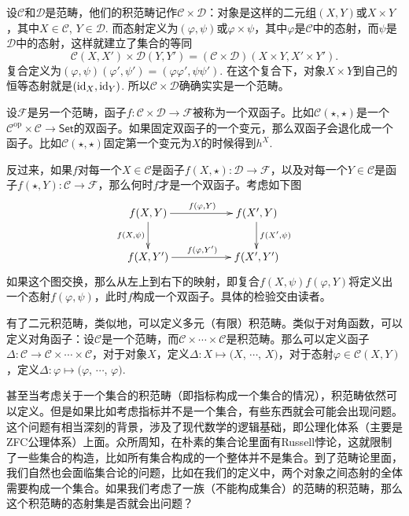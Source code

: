设$\mathcal{C}$和$\mathcal{D}$是范畴，他们的积范畴记作$\mathcal{C}\times\mathcal{D}$：对象是这样的二元组$(X,Y)$或$X\times Y$，其中$X\in \mathcal{C}$, $Y\in\mathcal{D}$. 而态射定义为$(\varphi,\psi)$或$\varphi\times \psi$，其中$\varphi$是$\mathcal{C}$中的态射，而$\psi$是$\mathcal{D}$中的态射，这样就建立了集合的等同
\[
	{\mathcal{C}}(X,X')\times {\mathcal{D}}(Y,Y')=(\mathcal{C}\times \mathcal{D})(X\times Y,X'\times Y').
\]
复合定义为$(\varphi,\psi)(\varphi',\psi')=(\varphi\varphi',\psi\psi')$. 在这个复合下，对象$X\times Y$到自己的恒等态射就是$(\operatorname{id}_X,\operatorname{id}_Y)$. 所以$\mathcal{C}\times\mathcal{D}$确确实实是一个范畴。

设$\mathcal{F}$是另一个范畴，函子$f:\mathcal{C}\times \mathcal{D}\to \mathcal{F}$被称为一个双函子。比如$\mathcal{C}(\star,\star)$是一个$\mathcal{C}^\text{op}\times \mathcal{C}\to \mathsf{Set}$的双函子。如果固定双函子的一个变元，那么双函子会退化成一个函子。比如$\mathcal{C}(\star,\star)$固定第一个变元为$X$的时候得到$h^X$.

反过来，如果$f$对每一个$X\in \mathcal{C}$是函子$f(X,\star):\mathcal{D}\to \mathcal{F}$，以及对每一个$Y\in \mathcal{C}$是函子$f(\star,Y):\mathcal{C}\to \mathcal{F}$，那么何时$f$才是一个双函子。考虑如下图
\[
\begin{xy}
	\xymatrix{
		f(X,Y)\ar[rr]^{f(\varphi,Y)} \ar[d]_{f(X,\psi)}&&f(X',Y) \ar[d]^{f(X',\psi)}\\
		f(X,Y')\ar[rr]^{f(\varphi,Y')}&&f(X',Y')
	}
\end{xy}
\]
如果这个图交换，那么从左上到右下的映射，即复合$f(X,\psi)f(\varphi,Y)$将定义出一个态射$f(\varphi,\psi)$，此时$f$构成一个双函子。具体的检验交由读者。

\para[对角函子] \label{digf}有了二元积范畴，类似地，可以定义多元（有限）积范畴。类似于对角函数，可以定义对角函子：设$\mathcal{C}$是一个范畴，而$\mathcal{C}\times \cdots \times \mathcal{C}$是积范畴。那么可以定义函子$\Delta:\mathcal{C}\to \mathcal{C}\times \cdots \times \mathcal{C}$，对于对象$X$，定义$\Delta:X\mapsto (X$, $\cdots$, $X)$，对于态射$\varphi\in \mathcal{C}(X,Y)$，定义$\Delta: \varphi \mapsto (\varphi$, $\cdots$, $\varphi)$.\endpara

甚至当考虑关于一个集合的积范畴（即指标构成一个集合的情况），积范畴依然可以定义。但是如果比如考虑指标并不是一个集合，有些东西就会可能会出现问题。这个问题有相当深刻的背景，涉及了现代数学的逻辑基础，即公理化体系（主要是ZFC公理体系）上面。众所周知，在朴素的集合论里面有Russell悖论，这就限制了一些集合的构造，比如所有集合构成的一个整体并不是集合。到了范畴论里面，我们自然也会面临集合论的问题，比如在我们的定义中，两个对象之间态射的全体需要构成一个集合。如果我们考虑了一族（不能构成集合）的范畴的积范畴，那么这个积范畴的态射集是否就会出问题？

